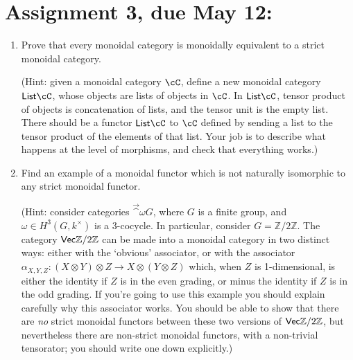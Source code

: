 \documentclass[12pt]{amsart}
\begin{document}
\section{Assignment 3, due May 12:}
\begin{enumerate}
\item Prove that every monoidal category is monoidally equivalent to a strict monoidal category.

(Hint: given a monoidal category $\cC$, define a new monoidal category $\mathsf{List} \cC$, whose objects are lists of objects in $\cC$. In $\mathsf{List} \cC$, tensor product of objects is concatenation of lists, and the tensor unit is the empty list. There should be a functor $\mathsf{List} \cC$ to $\cC$ defined by sending a list to the tensor product of the elements of that list. Your job is to describe what happens at the level of morphisms, and check that everything works.)

\item Find an example of a monoidal functor which is not naturally isomorphic to any strict monoidal functor.

(Hint: consider categories $\Vec^\omega G$, where $G$ is a finite group, and $\omega \in H^3(G, k^\times)$ is a 3-cocycle. In particular, consider $G = \mathbb Z / 2 \mathbb Z$. The category $\Vec \mathbb Z / 2 \mathbb Z$ can be made into a monoidal category in two
distinct ways: either with the `obvious' associator, or with the associator $\alpha_{X, Y, Z} : (X \otimes Y) \otimes Z \to X \otimes (Y \otimes Z)$ which, when $Z$ is 1-dimensional, is either the identity if $Z$ is in the even grading, or minus the identity if $Z$ is in the odd grading. If you're going to use this example you should explain carefully why this associator works. You should be able to show that there are \emph{no} strict monoidal functors between these two versions of $\Vec \mathbb Z / 2 \mathbb Z$, but nevertheless there are non-strict monoidal functors, with a non-trivial tensorator; you should write one down explicitly.)


\end{enumerate}
\end{document}
